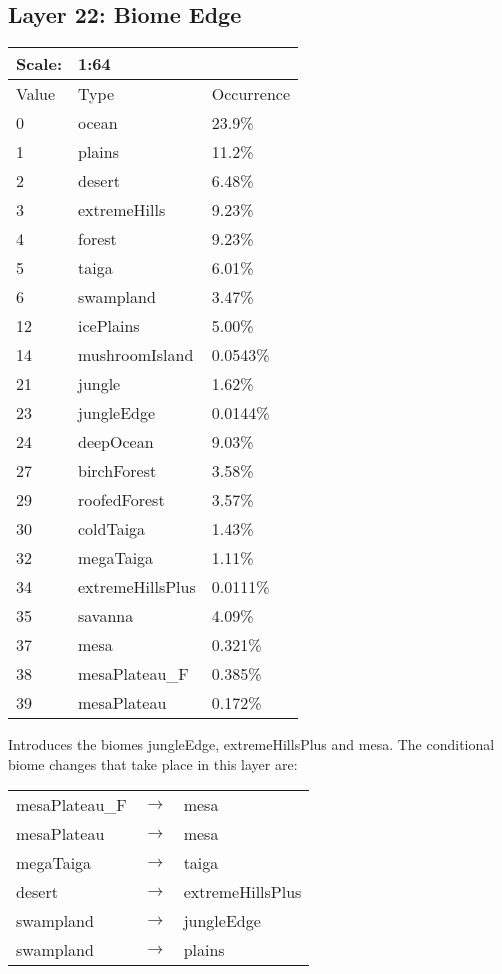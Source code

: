 \documentclass{article}
\begin{document}
	\subsection{Layer 22: Biome Edge}
	\begin{tabular}{|l|l|l|}\hline
		Scale: & \multicolumn{2}{|l|}{1:64} \\\hline\hline
		Value  & Type             & Occurrence \\\hline
		0      & ocean            & 23.9\%\\\hline
		1      & plains           & 11.2\%\\\hline
		2      & desert           & 6.48\%\\\hline
		3      & extremeHills     & 9.23\%\\\hline
		4      & forest           & 9.23\%\\\hline
		5      & taiga            & 6.01\%\\\hline
		6      & swampland        & 3.47\%\\\hline
		12     & icePlains        & 5.00\%\\\hline
		14     & mushroomIsland   & 0.0543\%\\\hline
		21     & jungle           & 1.62\%\\\hline
		23     & jungleEdge       & 0.0144\%\\\hline
		24     & deepOcean        & 9.03\%\\\hline
		27     & birchForest      & 3.58\%\\\hline
		29     & roofedForest     & 3.57\%\\\hline
		30     & coldTaiga        & 1.43\%\\\hline
		32     & megaTaiga        & 1.11\%\\\hline
		34     & extremeHillsPlus & 0.0111\%\\\hline
		35     & savanna          & 4.09\%\\\hline
		37     & mesa             & 0.321\%\\\hline
 		38     & mesaPlateau\_F   & 0.385\%\\\hline
		39     & mesaPlateau      & 0.172\%\\\hline
	\end{tabular}
	
	\medskip\noindent
	Introduces the biomes jungleEdge, extremeHillsPlus and mesa. The conditional biome changes that take place in this layer are:
	
	\begin{tabular}{l c l}
		mesaPlateau\_F & $\longrightarrow$ & mesa\\
		mesaPlateau & $\longrightarrow$ & mesa\\
		megaTaiga & $\longrightarrow$ & taiga\\
		desert & $\longrightarrow$ & extremeHillsPlus\\
		swampland & $\longrightarrow$ & jungleEdge \\
		swampland & $\longrightarrow$ & plains
	\end{tabular}
\end{document}

